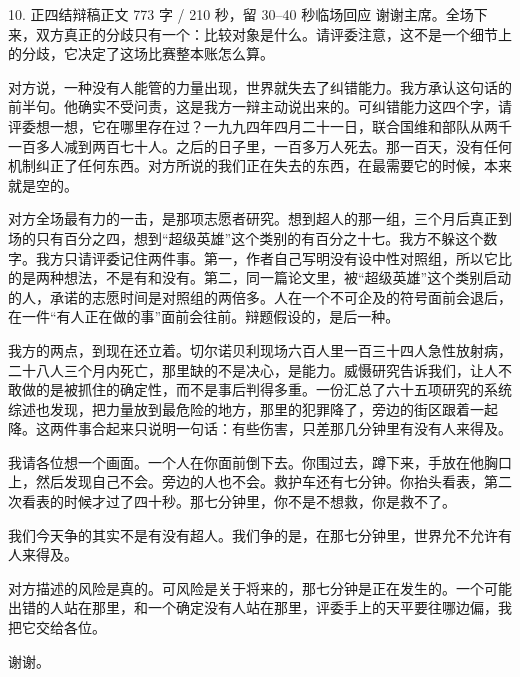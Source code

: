 \documentclass[script,pro]{debate}
\begin{document}
\begin{speech}{10. 正四结辩稿}{正文 773 字 / 210 秒，留 30–40 秒临场回应}
谢谢主席。全场下来，双方真正的分歧只有一个：比较对象是什么。请评委注意，这不是一个细节上的分歧，它决定了这场比赛整本账怎么算。

对方说，一种没有人能管的力量出现，世界就失去了纠错能力。我方承认这句话的前半句。他确实不受问责，这是我方一辩主动说出来的。可纠错能力这四个字，请评委想一想，它在哪里存在过？一九九四年四月二十一日，联合国维和部队从两千一百多人减到两百七十人。之后的日子里，一百多万人死去。那一百天，没有任何机制纠正了任何东西。对方所说的我们正在失去的东西，在最需要它的时候，本来就是空的。

对方全场最有力的一击，是那项志愿者研究。想到超人的那一组，三个月后真正到场的只有百分之四，想到“超级英雄”这个类别的有百分之十七。我方不躲这个数字。我方只请评委记住两件事。第一，作者自己写明没有设中性对照组，所以它比的是两种想法，不是有和没有。第二，同一篇论文里，被“超级英雄”这个类别启动的人，承诺的志愿时间是对照组的两倍多。人在一个不可企及的符号面前会退后，在一件“有人正在做的事”面前会往前。辩题假设的，是后一种。

我方的两点，到现在还立着。切尔诺贝利现场六百人里一百三十四人急性放射病，二十八人三个月内死亡，那里缺的不是决心，是能力。威慑研究告诉我们，让人不敢做的是被抓住的确定性，而不是事后判得多重。一份汇总了六十五项研究的系统综述也发现，把力量放到最危险的地方，那里的犯罪降了，旁边的街区跟着一起降。这两件事合起来只说明一句话：有些伤害，只差那几分钟里有没有人来得及。

我请各位想一个画面。一个人在你面前倒下去。你围过去，蹲下来，手放在他胸口上，然后发现自己不会。旁边的人也不会。救护车还有七分钟。你抬头看表，第二次看表的时候才过了四十秒。那七分钟里，你不是不想救，你是救不了。

我们今天争的其实不是有没有超人。我们争的是，在那七分钟里，世界允不允许有人来得及。

对方描述的风险是真的。可风险是关于将来的，那七分钟是正在发生的。一个可能出错的人站在那里，和一个确定没有人站在那里，评委手上的天平要往哪边偏，我把它交给各位。

谢谢。

\begin{contingency}
\end{contingency}
\end{speech}
\end{document}
